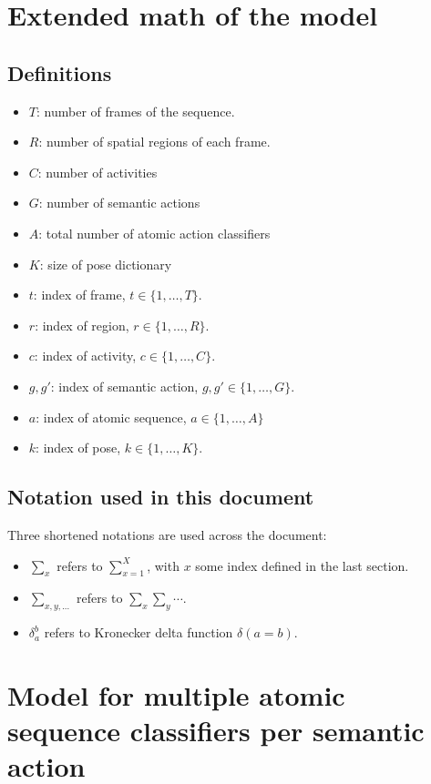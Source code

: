 \documentclass[10pt,letterpaper]{article}
\newcommand{\+}[1]{\ensuremath{{\boldsymbol #1}}}
\begin{document}
\section{Extended math of the model}

\subsection*{Definitions}
\begin{itemize}
\item $T$: number of frames of the sequence.
\item $R$: number of spatial regions of each frame.
\item $C$: number of activities
\item $G$: number of semantic actions
\item $A$: total number of atomic action classifiers
\item $K$: size of pose dictionary
\item $t$: index of frame, $t \in \{1,\dots,T\}$.
\item $r$: index of region, $r \in \{1,\dots,R\}$.
\item $c$: index of activity, $c \in \{1,\dots,C\}$.
\item $g,g'$: index of semantic action, $g,g' \in \{1,\dots,G\}$.
\item $a$: index of atomic sequence, $a \in \{1,\dots,A\}$
\item $k$: index of pose, $k \in \{1,\dots,K\}$.
\end{itemize}

\subsection*{Notation used in this document}
Three shortened notations are used across the document:
\begin{itemize}
\item $\sum_x$ refers to $\sum_{x=1}^X$, with $x$ some index defined in the last section.
\item $\sum_{x,y,...}$ refers to $\sum_x \sum_y \cdots$.
\item $\delta_a^b$ refers to Kronecker delta function $\delta(a = b)$.
\end{itemize}


\section{Model for multiple atomic sequence classifiers per semantic action}
\end{document}
